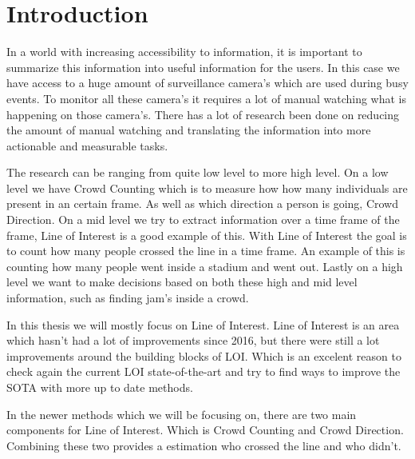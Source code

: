 \section{Introduction}
In a world with increasing accessibility to information, it is important to summarize this information into useful information for the users.  In this case we have access to a huge amount of surveillance camera's which are used during busy events. To monitor all these camera's it requires a lot of manual watching what is happening on those camera's. There has a lot of research been done on reducing the amount of manual watching and translating the information into more actionable and measurable tasks.

The research can be ranging from quite low level to more high level. On a low level we have Crowd Counting which is to measure how how many individuals are present in an certain frame. As well as which direction a person is going, Crowd Direction. On a mid level we try to extract information over a time frame of the frame, Line of Interest is a good example of this. With Line of Interest the goal is to count how many people crossed the line in a time frame. An example of this is counting how many people went inside a stadium and went out. Lastly on a high level we want to make decisions based on both these high and mid level information, such as finding jam's inside a crowd.

In this thesis we will mostly focus on Line of Interest. Line of Interest is an area which hasn't had a lot of improvements since 2016, but there were still a lot improvements around the building blocks of LOI. Which is an excelent reason to check again the current LOI state-of-the-art and try to find ways to improve the SOTA with more up to date methods.

In the newer methods which we will be focusing on, there are two main components for Line of Interest. Which is Crowd Counting and Crowd Direction. Combining these two provides a estimation who crossed the line and who didn't.



